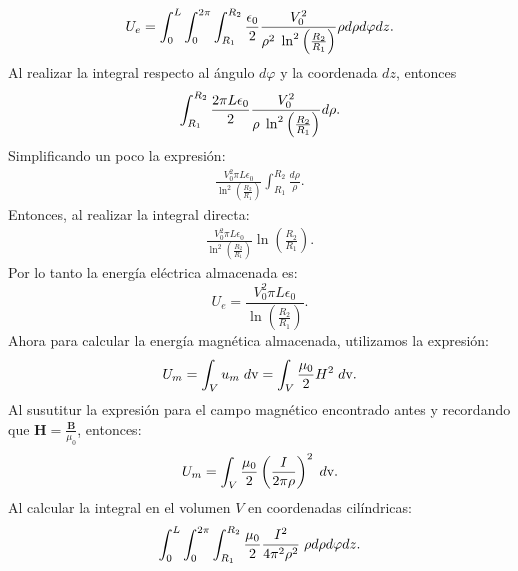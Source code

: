 \documentclass[11pt,fleqn]{book} %
\begin{document}
\begin{example}
\begin{eqnarray*}
U_{e}=\int_{0}^{L}\int_{0}^{2\pi}\int_{R_{1}}^{R_{2}}\frac{\epsilon_{0}}{2} \frac{V_{0}^{2}}{\rho^{2} \hspace{1mm}\ln^{2}\left( \frac{R_{2}}{R_{1}} \right)}\rho d\rho d\varphi dz.
\end{eqnarray*}
Al realizar la integral respecto al \'angulo $d\varphi$ y la coordenada $dz$, entonces
\begin{eqnarray*}
\int_{R_{1}}^{R_{2}}\frac{2\pi L\epsilon_{0}}{2} \frac{V_{0}^{2}}{\rho \hspace{1mm}\ln^{2}\left( \frac{R_{2}}{R_{1}} \right)} d\rho.
\end{eqnarray*}
Simplificando un poco la expresi\'on:
\begin{eqnarray*}
\frac{V_{0}^{2}\pi L\epsilon_{0}}{\ln^{2}\left( \frac{R_{2}}{R_{1}} \right)}\int_{R_{1}}^{R_{2}} \frac{d\rho}{\rho}.
\end{eqnarray*}
Entonces, al realizar la integral directa:
\begin{eqnarray*}
\frac{V_{0}^{2}\pi L\epsilon_{0}}{\ln^{2}\left( \frac{R_{2}}{R_{1}} \right)} \ln\left(\frac{R_{2}}{R_{1}}\right).
\end{eqnarray*}
Por lo tanto la energ\'ia el\'ectrica almacenada es:
\begin{equation}
U_{e}=\frac{V_{0}^{2}\pi L\epsilon_{0}}{\ln\left( \frac{R_{2}}{R_{1}} \right)}.
\end{equation}
Ahora para calcular la energ\'ia magn\'etica almacenada, utilizamos la expresi\'on:
\begin{eqnarray*}
U_{m}=\int_{V} u_{m}\hspace{1mm} d\text{v}=\int_{V}\frac{\mu_{0}}{2}H^{2}\hspace{1mm}d\text{v}.
\end{eqnarray*}
Al susutitur la expresi\'on para el campo magn\'etico encontrado antes y recordando que $\textbf{H}=\frac{\textbf{B}}{\mu_{0}}$, entonces:
\begin{eqnarray*}
U_{m}=\int_{V}\frac{\mu_{0}}{2}\left( \frac{I}{2\pi\rho} \right)^{2}\hspace{1mm}d\text{v}.
\end{eqnarray*}
Al calcular la integral en el volumen $V$ en coordenadas cil\'indricas:
\begin{eqnarray*}
\int_{0}^{L}\int_{0}^{2\pi}\int_{R_{1}}^{R_{2}}\frac{\mu_{0}}{2} \frac{I^{2}}{4\pi^{2}\rho^{2}} \hspace{1mm}\rho d\rho d\varphi dz.
\end{eqnarray*}

\end{example}
\end{document}
